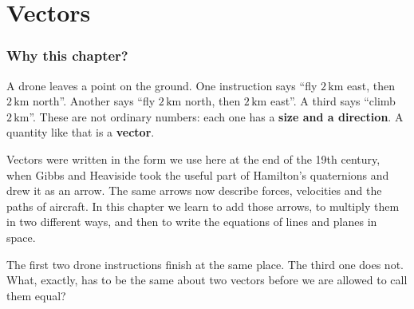 
\chapter{Vectors}

\localtableofcontents

\vspace{4mm}
\subsection*{Why this chapter?}
A drone leaves a point on the ground. One instruction says ``fly $2\,\mathrm{km}$ east, then $2\,\mathrm{km}$ north''. Another says ``fly $2\,\mathrm{km}$ north, then $2\,\mathrm{km}$ east''. A third says ``climb $2\,\mathrm{km}$''. These are not ordinary numbers: each one has a \textbf{size and a direction}. A quantity like that is a \textbf{vector}.

Vectors were written in the form we use here at the end of the 19th century, when Gibbs and Heaviside took the useful part of Hamilton's quaternions and drew it as an arrow. The same arrows now describe forces, velocities and the paths of aircraft. In this chapter we learn to add those arrows, to multiply them in two different ways, and then to write the equations of lines and planes in space.

\begin{question}
The first two drone instructions finish at the same place. The third one does not. What, exactly, has to be the same about two vectors before we are allowed to call them equal?
\end{question}

